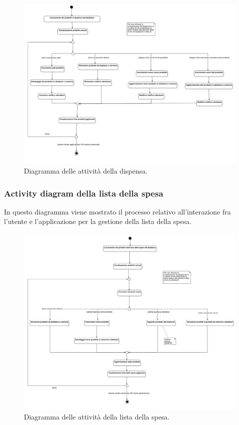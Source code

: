 \documentclass{article}
\begin{document}
\begin{figure}[H]
    \includegraphics[width=\linewidth]{images/activity-pantry.png}
    \caption{Diagramma delle attività della dispensa.}
    \label{fig:actpantry}
\end{figure}

\subsubsection{Activity diagram della lista della spesa}

In questo diagramma viene mostrato il processo relativo all'interazione fra l'utente e l'applicazione per la gestione della lista della spesa.

\begin{figure}[H]
    \includegraphics[width=\linewidth]{images/activity-shopping-list.png}
    \caption{Diagramma delle attività della lista della spesa.}
    \label{fig:actshoplist}
\end{figure}
\end{document}
